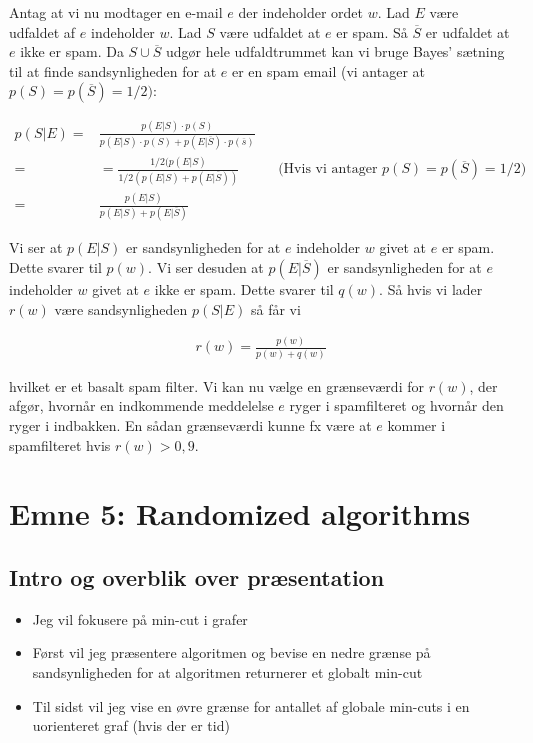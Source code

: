 \documentclass[12pt]{article}
\begin{document}
Antag at vi nu modtager en e-mail $e$ der indeholder ordet $w$. Lad $E$ være udfaldet af $e$ indeholder $w$. Lad $S$ være udfaldet at $e$ er spam. Så $\overline{S}$ er udfaldet at $e$ ikke er spam. Da $S \cup \overline{S}$ udgør hele udfaldtrummet kan vi bruge Bayes' sætning til at finde sandsynligheden for at $e$ er en spam email (vi antager at $p(S)=p(\overline{S})=1/2)$:

\begin{align*}
    p(S|E) =& \frac{p(E|S) \cdot p(S)}{p(E|S) \cdot p(S) + p(E|\overline{S}) \cdot p(\overline{s})} \\
    =&= \frac{1/2(p(E|S)}{1/2(p(E|S) + p(E|\overline{S}))} && \text{(Hvis vi antager } p(S)=p(\overline{S}) =1/2) \\
    =& \frac{p(E|S)}{p(E|S) + p(E|\overline{S})} 
\end{align*}

Vi ser at $p(E|S)$ er sandsynligheden for at $e$ indeholder $w$ givet at $e$ er spam. Dette svarer til $p(w)$. Vi ser desuden at $p(E|\overline{S})$ er sandsynligheden for at $e$ indeholder $w$ givet at $e$ ikke er spam. Dette svarer til $q(w)$. Så hvis vi lader $r(w)$ være sandsynligheden $p(S|E)$ så får vi 

\begin{align*}
    r(w) = \frac{p(w)}{p(w) + q(w)}
\end{align*}

hvilket er et basalt spam filter. Vi kan nu vælge en grænseværdi for $r(w)$, der afgør, hvornår en indkommende meddelelse $e$ ryger i spamfilteret og hvornår den ryger i indbakken. En sådan grænseværdi kunne fx være at $e$ kommer i spamfilteret hvis $r(w) > 0,9$. 

\newpage

\section{Emne 5: Randomized algorithms}

\subsection*{Intro og overblik over præsentation}

\begin{itemize}
    \item Jeg vil fokusere på min-cut i grafer
    \item Først vil jeg præsentere algoritmen og bevise en nedre grænse på sandsynligheden for at algoritmen returnerer et globalt min-cut
    \item Til sidst vil jeg vise en øvre grænse for antallet af globale min-cuts i en uorienteret graf (hvis der er tid)
\end{itemize}
\end{document}
